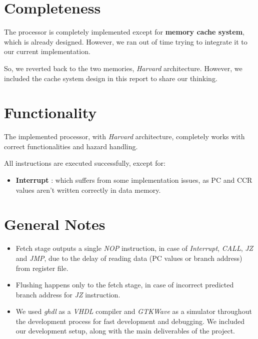 \section{Completeness}
The processor is completely implemented except for \textbf{memory cache system}, which is already designed. However, we ran out of time trying to integrate it to our current implementation.

So, we reverted back to the two memories, \emph{Harvard} architecture. However, we included the cache system design in this report to share our thinking.

\section{Functionality}
The implemented processor, with \emph{Harvard} architecture, completely works with correct functionalities and hazard handling.

All instructions are executed successfully, except for:
\begin{itemize}
    \item \textbf{Interrupt} : which suffers from some implementation issues, as PC and CCR values aren't written correctly in data memory.
\end{itemize}

\section{General Notes}
\begin{itemize}
    \item Fetch stage outputs a single \emph{NOP} instruction, in case of \emph{Interrupt}, \emph{CALL}, \emph{JZ} and \emph{JMP}, due to the delay of reading data (PC values or branch address) from register file.
    \item Flushing happens only to the fetch stage, in case of incorrect predicted branch address for \emph{JZ} instruction.
    \item We used \emph{ghdl} as a \emph{VHDL} compiler and \emph{GTKWave} as a simulator throughout the development process for fast development and debugging. We included our development setup, along with the main deliverables of the project. 
\end{itemize}